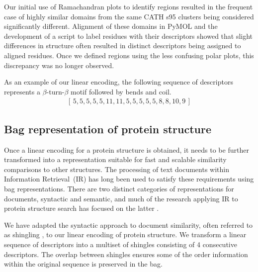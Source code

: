 \documentclass[a4,center,fleqn]{NAR}
\begin{document}

Our initial use of Ramachandran plots to identify regions resulted in the frequent case of highly similar domains from the same CATH s95 clusters being considered significantly different. 
Alignment of these domains in PyMOL \cite{PyMOL} and the development of a script to label residues with their descriptors showed that slight differences in structure often resulted in distinct descriptors being assigned to aligned residues. 
Once we defined regions using the less confusing polar plots, this discrepancy was no longer observed. 

As an example of our linear encoding, the following sequence of descriptors represents a $\beta$-turn-$\beta$ motif followed by bends and coil.
\begin{gather}\label{E:descrseq} 
    [\, 5, 5, 5, 5, 5, 11, 11, 5, 5, 5, 5, 5, 8, 8, 10, 9 \,]
\end{gather}

\subsection{Bag representation of protein structure}

Once a linear encoding for a protein structure is obtained, it needs to be further transformed into a representation suitable for fast and scalable similarity comparisons to other structures.
The processing of text documents within Information Retrieval~(IR) has long been used to satisfy these requirements using bag representations.
There are two distinct categories of representations for documents, syntactic and semantic, and much of the research applying IR to protein structure search has focused on the latter \cite{Aungand2004,Zhang2010,Budowski2010}. 

We have adapted the syntactic approach to document similarity, often referred to as shingling \cite{Broder1997a}, to our linear encoding of protein structure. 
We transform a linear sequence of descriptors into a multiset of shingles consisting of 4 consecutive descriptors.
The overlap between shingles ensures some of the order information within the original sequence is preserved in the bag. 
\end{document}
